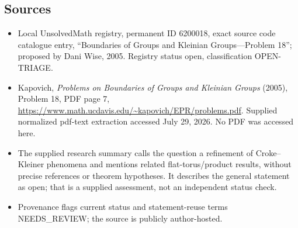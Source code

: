 \documentclass[11pt]{article}
\begin{document}
\subsection{Sources}
\begin{itemize}
\item Local UnsolvedMath registry, permanent ID 6200018, exact source code catalogue entry, ``Boundaries of Groups and Kleinian Groups---Problem 18''; proposed by Dani Wise, 2005. Registry status open, classification OPEN-TRIAGE.
\item Kapovich, \emph{Problems on Boundaries of Groups and Kleinian Groups} (2005), Problem 18, PDF page 7, \url{https://www.math.ucdavis.edu/~kapovich/EPR/problems.pdf}. Supplied normalized pdf-text extraction accessed July 29, 2026. No PDF was accessed here.
\item The supplied research summary calls the question a refinement of Croke--Kleiner phenomena and mentions related flat-torus/product results, without precise references or theorem hypotheses. It describes the general statement as open; that is a supplied assessment, not an independent status check.
\item Provenance flags current status and statement-reuse terms NEEDS\_REVIEW; the source is publicly author-hosted.
\end{itemize}
\end{document}
